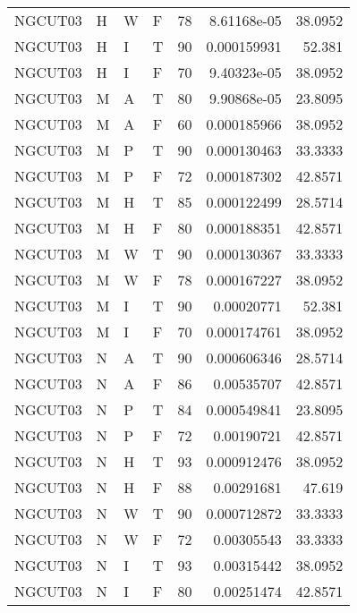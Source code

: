 \begin{table}[!htb]
{\begin{tabular}{llllrrr}
            NGCUT03  & H     & W     & F          & 78         & 8.61168e-05 & 38.0952  \\
            NGCUT03  & H     & I     & T          & 90         & 0.000159931 & 52.381   \\
            NGCUT03  & H     & I     & F          & 70         & 9.40323e-05 & 38.0952  \\
            NGCUT03  & M     & A     & T          & 80         & 9.90868e-05 & 23.8095  \\
            NGCUT03  & M     & A     & F          & 60         & 0.000185966 & 38.0952  \\
            NGCUT03  & M     & P     & T          & 90         & 0.000130463 & 33.3333  \\
            NGCUT03  & M     & P     & F          & 72         & 0.000187302 & 42.8571  \\
            NGCUT03  & M     & H     & T          & 85         & 0.000122499 & 28.5714  \\
            NGCUT03  & M     & H     & F          & 80         & 0.000188351 & 42.8571  \\
            NGCUT03  & M     & W     & T          & 90         & 0.000130367 & 33.3333  \\
            NGCUT03  & M     & W     & F          & 78         & 0.000167227 & 38.0952  \\
            NGCUT03  & M     & I     & T          & 90         & 0.00020771  & 52.381   \\
            NGCUT03  & M     & I     & F          & 70         & 0.000174761 & 38.0952  \\
            NGCUT03  & N     & A     & T          & 90         & 0.000606346 & 28.5714  \\
            NGCUT03  & N     & A     & F          & 86         & 0.00535707  & 42.8571  \\
            NGCUT03  & N     & P     & T          & 84         & 0.000549841 & 23.8095  \\
            NGCUT03  & N     & P     & F          & 72         & 0.00190721  & 42.8571  \\
            NGCUT03  & N     & H     & T          & 93         & 0.000912476 & 38.0952  \\
            NGCUT03  & N     & H     & F          & 88         & 0.00291681  & 47.619   \\
            NGCUT03  & N     & W     & T          & 90         & 0.000712872 & 33.3333  \\
            NGCUT03  & N     & W     & F          & 72         & 0.00305543  & 33.3333  \\
            NGCUT03  & N     & I     & T          & 93         & 0.00315442  & 38.0952  \\
            NGCUT03  & N     & I     & F          & 80         & 0.00251474  & 42.8571  \\
            \hline
        \end{tabular}
    }{}
\end{table}